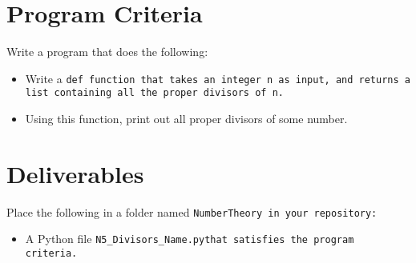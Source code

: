 \documentclass{article}
\def\prog#1{
\vspace{.1in}\begin{mdframed} \begin{center} \textbf{Programming Reminders} \end{center}#1 \end{mdframed} }
\newcommand\foldername{\tt{NumberTheory} }
\newcommand\filename{\tt{N5\_Divisors\_Name.py}\;\;}
\begin{document}
	
	
	
	
	
	
	
	




\section*{Program Criteria}
	Write a program that does the following:
	\begin{itemize}
		\item Write a \tt{def} function that takes an integer \tt{n} as input, and returns a list containing all the proper divisors of \tt{n}.
		\item Using this function, print out all proper divisors of some number.
	\end{itemize}







\section*{Deliverables}
	
	
	Place the following in a folder named \foldername in your repository:
	\begin{itemize}
		\item A Python file \filename  that satisfies the program criteria.
	\end{itemize}

	
\end{document}
